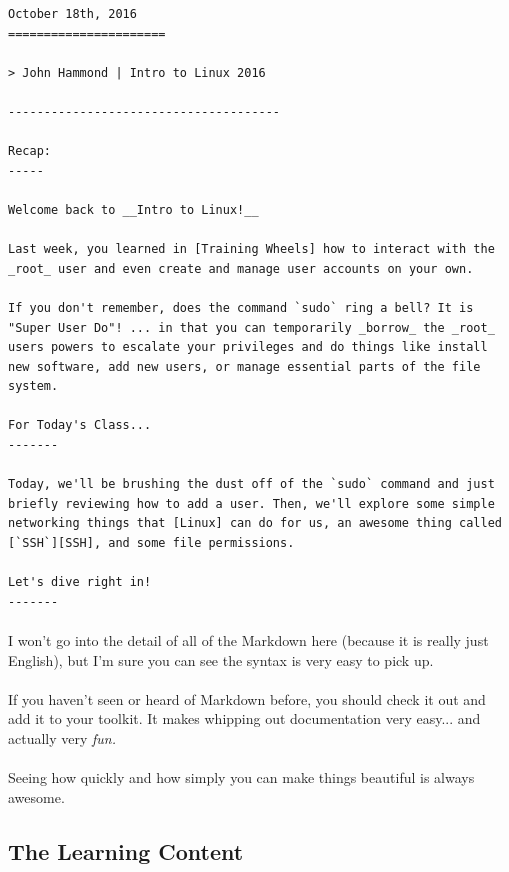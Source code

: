 \documentclass[11pt]{article}
\begin{document}
	\begin{lstlisting}
October 18th, 2016
======================

> John Hammond | Intro to Linux 2016

--------------------------------------

Recap:
-----

Welcome back to __Intro to Linux!__

Last week, you learned in [Training Wheels] how to interact with the _root_ user and even create and manage user accounts on your own. 

If you don't remember, does the command `sudo` ring a bell? It is "Super User Do"! ... in that you can temporarily _borrow_ the _root_ users powers to escalate your privileges and do things like install new software, add new users, or manage essential parts of the file system.

For Today's Class...
-------

Today, we'll be brushing the dust off of the `sudo` command and just briefly reviewing how to add a user. Then, we'll explore some simple networking things that [Linux] can do for us, an awesome thing called [`SSH`][SSH], and some file permissions. 

Let's dive right in!
-------

	\end{lstlisting}	

	\paragraph{} I won't go into the detail of all of the Markdown here (because it is really just English), but I'm sure you can see the syntax is very easy to pick up.

	\paragraph{} If you haven't seen or heard of Markdown before, you should check it out and add it to your toolkit. It makes whipping out documentation very easy... and actually very \textit{fun.}

	\paragraph{} Seeing how quickly and how simply you can make things beautiful is always awesome.

	\newpage

	\subsection{The Learning Content}
\end{document}
